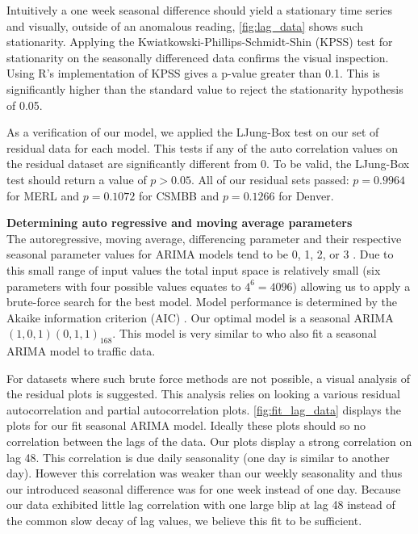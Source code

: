 Intuitively a one week seasonal difference should yield a stationary time series and visually, outside of an anomalous reading, \ref{fig:lag_data} shows such stationarity.  Applying the Kwiatkowski-Phillips-Schmidt-Shin (KPSS) \cite{Kwiatkowski1992} test for stationarity on the seasonally differenced data confirms the visual inspection.  Using R's implementation of KPSS gives a p-value greater than 0.1.  This is significantly higher than the standard value to reject the stationarity hypothesis of 0.05.  

As a verification of our model, we applied the LJung-Box test \cite{Ljung1978} on our set of residual data for each model.  This tests if any of the auto correlation values on the residual dataset are significantly different from 0.  To be valid, the LJung-Box test should return a value of $p > 0.05$.  All of our residual sets passed: $p = 0.9964$ for MERL and $p = 0.1072$ for CSMBB and $p = 0.1266$ for Denver.  

\bigskip
\noindent \textbf{Determining auto regressive and moving average parameters} \\
The autoregressive, moving average, differencing parameter and their respective seasonal parameter values for ARIMA models tend to be 0, 1, 2, or 3 \cite{Box2008}.  Due to this small range of input values the total input space is relatively small (six parameters with four possible values equates to $4^6 = 4096$) allowing us to apply a brute-force search for the best model.  Model performance is determined by the Akaike information criterion (AIC) \cite{Akaike1974}.  Our optimal model is a seasonal ARIMA $(1,0,1)(0,1,1)_{168}$.      This model is very similar to \cite{Williams2003} who also fit a seasonal ARIMA model to traffic data.

For datasets where such brute force methods are not possible, a visual analysis of the residual plots is suggested.  This analysis relies on looking a various residual autocorrelation and partial autocorrelation plots.  \ref{fig:fit_lag_data} displays the plots for our fit seasonal ARIMA model.  Ideally these plots should so no correlation between the lags of the data.  Our plots display a strong correlation on lag 48.  This correlation is due daily seasonality (one day is similar to another day).  However this correlation was weaker than our weekly seasonality and thus our introduced seasonal difference was for one week instead of one day.  Because our data exhibited little lag correlation with one large blip at lag 48 instead of the common slow decay of lag values, we believe this fit to be sufficient.  

